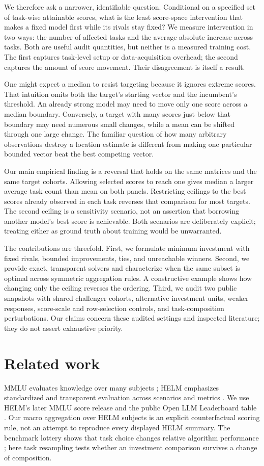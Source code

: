 \documentclass{article}
\begin{document}
We therefore ask a narrower, identifiable question. Conditional on a specified set
of task-wise attainable scores, what is the least score-space intervention that makes
a fixed model first while its rivals stay fixed? We measure intervention in two ways:
the number of affected tasks and the average absolute increase across tasks. Both
are useful audit quantities, but neither is a measured training cost. The first
captures task-level setup or data-acquisition overhead; the second captures the
amount of score movement. Their disagreement is itself a result.

One might expect a median to resist targeting because it ignores extreme scores.
That intuition omits both the target's starting vector and the incumbent's threshold.
An already strong model may need to move only one score across a median boundary.
Conversely, a target with many scores just below that boundary may need numerous
small changes, while a mean can be shifted through one large change. The familiar
question of how many arbitrary observations destroy a location estimate is different
from making one particular bounded vector beat the best competing vector.

Our main empirical finding is a reversal that holds on the same matrices and the
same target cohorts. Allowing selected scores to reach one gives median a larger
average task count than mean on both panels. Restricting ceilings to the best scores
already observed in each task reverses that comparison for most targets. The second
ceiling is a sensitivity scenario, not an assertion that borrowing another model's
best score is achievable. Both scenarios are deliberately explicit; treating either
as ground truth about training would be unwarranted.

The contributions are threefold. First, we formulate minimum investment with fixed
rivals, bounded improvements, ties, and unreachable winners. Second, we provide
exact, transparent solvers and characterize when the same subset is optimal across
symmetric aggregation rules. A constructive example shows how changing only the
ceiling reverses the ordering. Third, we audit two public snapshots with shared
challenger cohorts, alternative investment units, weaker responses, score-scale and
row-selection controls, and task-composition perturbations. Our claims concern
these audited settings and inspected literature; they do not assert exhaustive priority.

\section{Related work}
\label{sec:related}
MMLU evaluates knowledge over many subjects \citep{hendrycks2021mmlu}; HELM emphasizes
standardized and transparent evaluation across scenarios and metrics
\citep{liang2023helm}. We use HELM's later MMLU score release and the public Open LLM
Leaderboard table \citep{helm2025data,oll2025contents}. Our macro aggregation over
HELM subjects is an explicit counterfactual scoring rule, not an attempt to reproduce
every displayed HELM summary. The benchmark lottery shows that task choice changes
relative algorithm performance \citep{dehghani2021lottery}; here task resampling tests
whether an investment comparison survives a change of composition.
\end{document}
